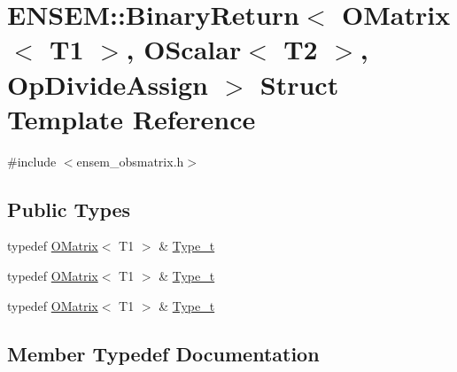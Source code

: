 \hypertarget{structENSEM_1_1BinaryReturn_3_01OMatrix_3_01T1_01_4_00_01OScalar_3_01T2_01_4_00_01OpDivideAssign_01_4}{}\section{E\+N\+S\+EM\+:\+:Binary\+Return$<$ O\+Matrix$<$ T1 $>$, O\+Scalar$<$ T2 $>$, Op\+Divide\+Assign $>$ Struct Template Reference}
\label{structENSEM_1_1BinaryReturn_3_01OMatrix_3_01T1_01_4_00_01OScalar_3_01T2_01_4_00_01OpDivideAssign_01_4}


{\ttfamily \#include $<$ensem\+\_\+obsmatrix.\+h$>$}

\subsection*{Public Types}
\begin{DoxyCompactItemize}
\item 
typedef \mbox{\hyperlink{classENSEM_1_1OMatrix}{O\+Matrix}}$<$ T1 $>$ \& \mbox{\hyperlink{structENSEM_1_1BinaryReturn_3_01OMatrix_3_01T1_01_4_00_01OScalar_3_01T2_01_4_00_01OpDivideAssign_01_4_a102ea2da5914e62170be58225f52a842}{Type\+\_\+t}}
\item 
typedef \mbox{\hyperlink{classENSEM_1_1OMatrix}{O\+Matrix}}$<$ T1 $>$ \& \mbox{\hyperlink{structENSEM_1_1BinaryReturn_3_01OMatrix_3_01T1_01_4_00_01OScalar_3_01T2_01_4_00_01OpDivideAssign_01_4_a102ea2da5914e62170be58225f52a842}{Type\+\_\+t}}
\item 
typedef \mbox{\hyperlink{classENSEM_1_1OMatrix}{O\+Matrix}}$<$ T1 $>$ \& \mbox{\hyperlink{structENSEM_1_1BinaryReturn_3_01OMatrix_3_01T1_01_4_00_01OScalar_3_01T2_01_4_00_01OpDivideAssign_01_4_a102ea2da5914e62170be58225f52a842}{Type\+\_\+t}}
\end{DoxyCompactItemize}


\subsection{Member Typedef Documentation}
\mbox{\label{structENSEM_1_1BinaryReturn_3_01OMatrix_3_01T1_01_4_00_01OScalar_3_01T2_01_4_00_01OpDivideAssign_01_4_a102ea2da5914e62170be58225f52a842}} 
